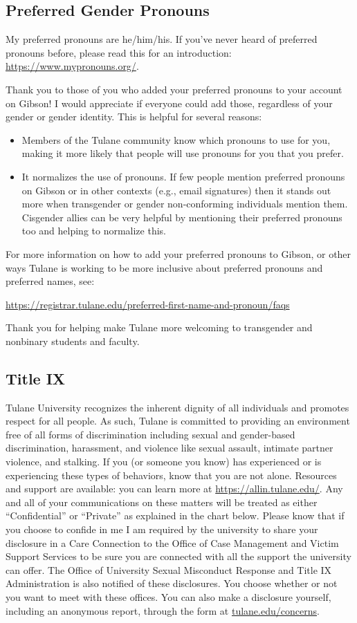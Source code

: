 \documentclass[11pt,letterpaper,final]{article}
\begin{document}
\subsection{Preferred Gender Pronouns}
My preferred pronouns are he/him/his. If you've never heard of preferred pronouns before, please read this for an introduction: \url{https://www.mypronouns.org/}.

Thank you to those of you who added your preferred pronouns to your account on Gibson! I would appreciate if everyone could add those, regardless of your gender or gender identity. This is helpful for several reasons:
\begin{itemize}
\item Members of the Tulane community know which pronouns to use for you, making it more likely that people will use pronouns for you that you prefer.
\item It normalizes the use of pronouns. If few people mention preferred pronouns on Gibson or in other contexts (e.g., email signatures) then it stands out more when transgender or gender non-conforming individuals mention them. Cisgender allies can be very helpful by mentioning their preferred pronouns too and helping to normalize this.
\end{itemize}

For more information on how to add your preferred pronouns to Gibson, or other ways Tulane is working to be more inclusive about preferred pronouns and preferred names, see:

\url{https://registrar.tulane.edu/preferred-first-name-and-pronoun/faqs} 

Thank you for helping make Tulane more welcoming to transgender and nonbinary students and faculty.

\subsection{Title IX}
Tulane University recognizes the inherent dignity of all individuals and promotes respect for all people. As such, Tulane is committed to providing an environment free of all forms of discrimination including sexual and gender-based discrimination, harassment, and violence like sexual assault, intimate partner violence, and stalking. If you (or someone you know) has experienced or is experiencing these types of behaviors, know that you are not alone. Resources and support are available: you can learn more at \url{https://allin.tulane.edu/}.  Any and all of your communications on these matters will be treated as either ``Confidential'' or ``Private'' as explained in the chart below. Please know that if you choose to confide in me I am required by the university to share your disclosure in a Care Connection to the Office of Case Management and Victim Support Services to be sure you are connected with all the support the university can offer.  The Office of University Sexual Misconduct Response and Title IX Administration is also notified of these disclosures.  You choose whether or not you want to meet with these offices. You can also make a disclosure yourself, including an anonymous report, through the form at \url{tulane.edu/concerns}.
\end{document}

